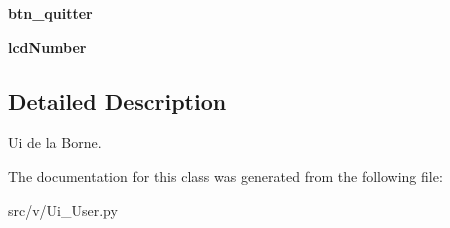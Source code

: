 \begin{DoxyCompactItemize}
\item 
\hypertarget{classsrc_1_1v_1_1_ui___user_1_1_ui___borne_a575031e8a515faa578d1a47d698fddf8}{}{\bfseries btn\+\_\+quitter}\label{classsrc_1_1v_1_1_ui___user_1_1_ui___borne_a575031e8a515faa578d1a47d698fddf8}

\item 
\hypertarget{classsrc_1_1v_1_1_ui___user_1_1_ui___borne_ac86c74c7861715e4d82094ebe33096b5}{}{\bfseries lcd\+Number}\label{classsrc_1_1v_1_1_ui___user_1_1_ui___borne_ac86c74c7861715e4d82094ebe33096b5}

\end{DoxyCompactItemize}


\subsection{Detailed Description}
Ui de la Borne. 

The documentation for this class was generated from the following file\+:\begin{DoxyCompactItemize}
\item 
src/v/Ui\+\_\+\+User.\+py\end{DoxyCompactItemize}
